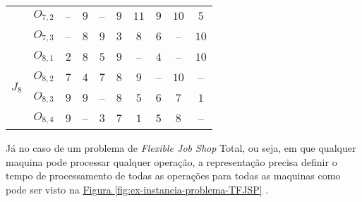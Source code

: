\begin{table}[htb]
\begin{tabular}{llcccccccc}
& $O_{7,2}$ & -- & $9$ & -- & $9$ & $11$ & $9$ & $10$ & $5$\\
& $O_{7,3}$ & -- & $8$ & $9$ & $3$ & $8$ & $6$ & -- & $10$\\
\multirow{4}{*}{$J_{8}$} & $O_{8,1}$ & $2$ & $8$ & $5$ & $9$ & -- & $4$ & -- & $10$\\
& $O_{8,2}$ & $7$ & $4$ & $7$ & $8$ & $9$ & -- & $10$ & --\\
& $O_{8,3}$ & $9$ & $9$ & -- & $8$ & $5$ & $6$ & $7$ & $1$\\
& $O_{8,4}$ & $9$ & -- & $3$ & $7$ & $1$ & $5$ & $8$ & --\\
\hline
  \end{tabular}
\end{table}


\indent Já no caso de um problema de \textit{Flexible Job Shop} Total, ou seja, em que qualquer maquina pode processar qualquer operação, a representação precisa definir o tempo de processamento de todas as operações para todas as maquinas como pode ser visto na 
\hyperref[fig:ex-instancia-problema-TFJSP]{Figura \ref{fig:ex-instancia-problema-TFJSP}}
.

